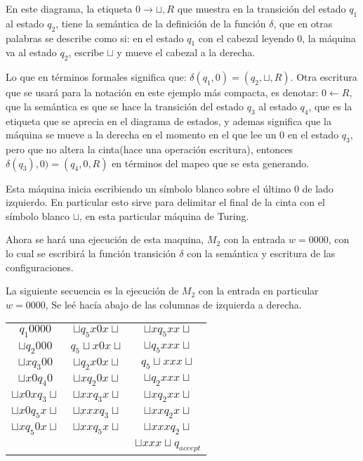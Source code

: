 \documentclass[10pt]{report}
\begin{document}
    En este diagrama, la etiqueta $0\rightarrow \sqcup,R$ que muestra en la transición del estado $q_{1}$ al estado $q_{2}$,
    tiene la semántica de la definición de la función $\delta$, que en otras palabras se describe como si:\newline
    en el estado $q_{1}$ con el cabezal leyendo $0$, la máquina va al estado $q_{2}$, escribe $\sqcup$ y mueve el cabezal
    a la derecha.\newline

    Lo que en términos formales significa que: $\delta(q_{1},0) = (q_{2},\sqcup, R)$.
    Otra escritura que se usará para la notación en este ejemplo más compacta,
    es denotar: $0\leftarrow R$, que la semántica es que se hace la transición del estado $q_{3}$ al estado $q_{4}$, que
    es la etiqueta que se aprecia en el diagrama de estados, y ademas significa que la máquina se mueve a la derecha en
    el momento en el que lee un $0$ en el estado $q_{3}$, pero que no altera la cinta(\no hace una operación escritura),
    entonces $\delta(q_{3}),0) = (q_{4},0,R)$ en términos del mapeo que se esta generando.\newline

    Esta máquina inicia escribiendo un símbolo blanco sobre el último $0$ de lado izquierdo. En particular esto sirve
    para delimitar el final de la cinta con el símbolo blanco $\sqcup$, en esta particular máquina de Turing.
    \newline

    Ahora se hará una ejecución de esta maquina, $M_{2}$ con la entrada $w = 0000$, con lo cual se escribirá la función
    transición $\delta$ con la semántica y escritura de las configuraciones.

    La siguiente secuencia es la ejecución de $M_{2}$ con la entrada en particular $w = 0000$,
    Se leé hacía abajo de las columnas de izquierda a derecha.

    \begin{center}
        \begin{tabular}{c c c}
            $q_{1}0000$ &     $\sqcup q_{5}x0x\sqcup$ & $\sqcup xq_{5}xx\sqcup$ \\
            $\sqcup q_{2}000$ & $q_{5}\sqcup x0x\sqcup$ & $\sqcup q_{5}xxx\sqcup$\\
            $\sqcup xq_{3}00$ & $\sqcup q_{2}x0x\sqcup$ & $q_{5}\sqcup xxx\sqcup$\\
            $\sqcup x0q_{4}0$  & $\sqcup xq_{2}0x\sqcup$ &   $\sqcup q_{2}xxx\sqcup$\\
            $\sqcup x0xq_{3}\sqcup$ & $\sqcup xxq_{3}x\sqcup$ & $\sqcup xq_{2}xx\sqcup$ \\
            $\sqcup x0q_{5}x\sqcup$ & $\sqcup xxxq_{3}\sqcup$ & $\sqcup xxq_{2}x\sqcup$ \\
            $\sqcup xq_{5}0x\sqcup$ & $\sqcup xxq_{5}x\sqcup$ & $\sqcup xxxq_{2}\sqcup$ \\
                            &                                 & $\sqcup xxx\sqcup q_{accept}$ \\
        \end{tabular}
    \end{center}
\end{document}

